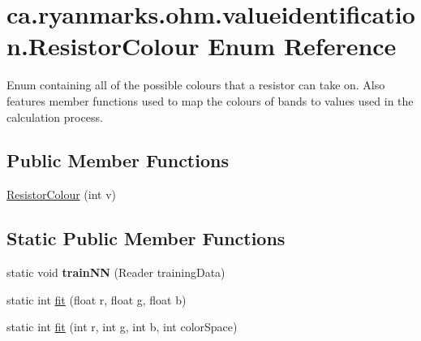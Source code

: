 \hypertarget{enumca_1_1ryanmarks_1_1ohm_1_1valueidentification_1_1_resistor_colour}{}\section{ca.\+ryanmarks.\+ohm.\+valueidentification.\+Resistor\+Colour Enum Reference}
\label{enumca_1_1ryanmarks_1_1ohm_1_1valueidentification_1_1_resistor_colour}


Enum containing all of the possible colours that a resistor can take on. Also features member functions used to map the colours of bands to values used in the calculation process.  


\subsection*{Public Member Functions}
\begin{DoxyCompactItemize}
\item 
\hyperlink{enumca_1_1ryanmarks_1_1ohm_1_1valueidentification_1_1_resistor_colour_acb42e95aa5bb7456ab3b527860b463a1}{Resistor\+Colour} (int v)
\end{DoxyCompactItemize}
\subsection*{Static Public Member Functions}
\begin{DoxyCompactItemize}
\item 
\hypertarget{enumca_1_1ryanmarks_1_1ohm_1_1valueidentification_1_1_resistor_colour_aa59a2846269caad5bcec5ba4bbd79936}{}\label{enumca_1_1ryanmarks_1_1ohm_1_1valueidentification_1_1_resistor_colour_aa59a2846269caad5bcec5ba4bbd79936} 
static void {\bfseries train\+NN} (Reader training\+Data)
\item 
static int \hyperlink{enumca_1_1ryanmarks_1_1ohm_1_1valueidentification_1_1_resistor_colour_a1f68c450e6879bce8909fca12402a1d7}{fit} (float r, float g, float b)
\item 
static int \hyperlink{enumca_1_1ryanmarks_1_1ohm_1_1valueidentification_1_1_resistor_colour_a26b7f5d2026cd9064a67ff6409c79562}{fit} (int r, int g, int b, int color\+Space)
\end{DoxyCompactItemize}
